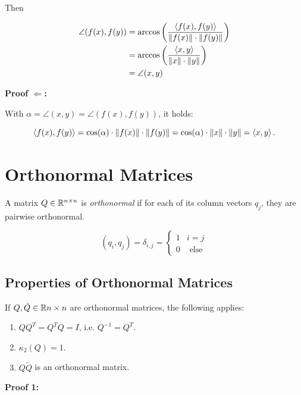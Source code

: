 Then

\begin{align*}
    \angle(f(x), f(y)) 
    &= \arccos\left( \frac{\left\langle f(x), f(y)\right\rangle}{\|f(x)\| \cdot \|f(y)\|} \right) \\
    &= \arccos\left( \frac{\left\langle x, y\right\rangle}{\|x\| \cdot \|y\|} \right) \\
    &= \angle(x, y)
\end{align*}

\QED

\textbf{Proof \(\Leftarrow\):} 

With \(\alpha = \angle(x, y) = \angle(f(x), f(y))\), it holds:

\[
    \left\langle f(x), f(y)\right\rangle = \cos(\alpha) \cdot \|f(x)\| \cdot \|f(y)\| = \cos(\alpha) 
    \cdot \|x\| \cdot \|y\| = \left\langle x, y\right\rangle.
\]

\QED

\section{Orthonormal Matrices}

A matrix \(Q \in \mathbb{R}^{n \times n}\) is \emph{orthonormal} if for each of its column vectors \(q_j\), they are pairwise orthonormal.

\[
    (q_i, q_j) = \delta_{i,j} = 
    \begin{cases}
        1 & i = j \\ 
        0 & \text{ else }
    \end{cases}
\]

\subsection{Properties of Orthonormal Matrices}

If \(Q, \tilde{Q} \in \mathbb{R}{n \times n}\) are orthonormal matrices, the following applies: 

\begin{enumerate}

    \item \(QQ^T = Q^TQ = I\), i.e. \(Q^{-1} = Q^T\).

    \item \(\kappa_2(Q) = 1\). 

    \item \(Q\tilde{Q}\) is an orthonormal matrix.

\end{enumerate}

\textbf{Proof 1:}

